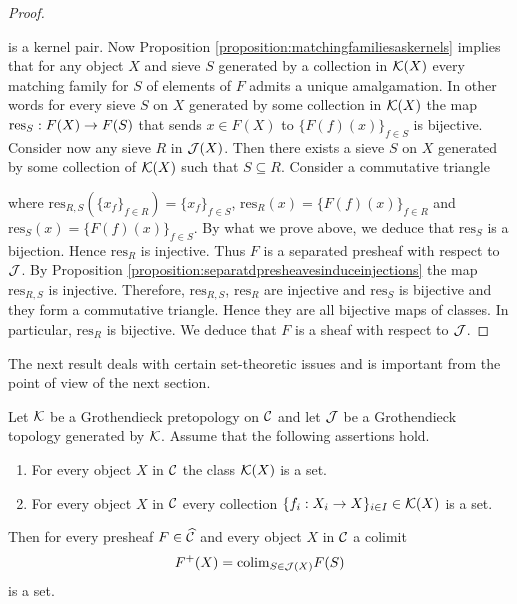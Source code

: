 \begin{proof}
\begin{center}
\end{center}
is a kernel pair. Now Proposition \ref{proposition:matchingfamiliesaskernels} implies that for any object $X$ and sieve $S$ generated by a collection in ${\mathcal K}(X)$ every matching family for $S$ of elements of $F$ admits a unique amalgamation. In other words for every sieve $S$ on $X$ generated by some collection in ${\mathcal K}(X)$ the map $\mathrm{res}_S:F(X)\rightarrow F(S)$ that sends $x\in F(X)$ to $\{F(f)(x)\}_{f\in S}$ is bijective. Consider now any sieve $R$ in ${\mathcal J}(X)$. Then there exists a sieve $S$ on $X$ generated by some collection of ${\mathcal K}(X)$ such that $S\subseteq R$. Consider a commutative triangle
\begin{center}
\end{center}
where $\mathrm{res}_{R,S}\left(\{x_f\}_{f\in R}\right)=\{x_f\}_{f\in S}$, $\mathrm{res}_{R}(x)=\{F(f)(x)\}_{f\in R}$ and $\mathrm{res}_{S}(x)=\{F(f)(x)\}_{f\in S}$. By what we prove above, we deduce that $\mathrm{res}_S$ is a bijection. Hence $\mathrm{res}_R$ is injective. Thus $F$ is a separated presheaf with respect to ${\mathcal J}$. By Proposition \ref{proposition:separatdpresheavesinduceinjections} the map $\mathrm{res}_{R,S}$ is injective. Therefore, $\mathrm{res}_{R,S}$, $\mathrm{res}_R$ are injective and $\mathrm{res}_S$ is bijective and they form a commutative triangle. Hence they are all bijective maps of classes. In particular, $\mathrm{res}_R$ is bijective. We deduce that $F$ is a sheaf with respect to ${\mathcal J}$.
\end{proof}
\noindent
The next result deals with certain set-theoretic issues and is important from the point of view of the next section.

\begin{proposition}
Let ${\mathcal K}$ be a Grothendieck pretopology on ${\mathcal C}$ and let ${\mathcal J}$ be a Grothendieck topology generated by ${\mathcal K}$. Assume that the following assertions hold.
\begin{enumerate}[label=\emph{\textbf{(\arabic*)}}, leftmargin=1.5em]
\item For every object $X$ in ${\mathcal C}$ the class ${\mathcal K}(X)$ is a set.
\item For every object $X$ in ${\mathcal C}$ every collection $\{f_i:X_i\rightarrow X\}_{i\in I}\in {\mathcal K}(X)$ is a set.
\end{enumerate}
Then for every presheaf $F\in \widehat{{\mathcal C}}$ and every object $X$ in ${\mathcal C}$ a colimit 
$$F^+(X) = \mathrm{colim}_{S\in {\mathcal J}(X)}F(S)$$
is a set.
\end{proposition}



